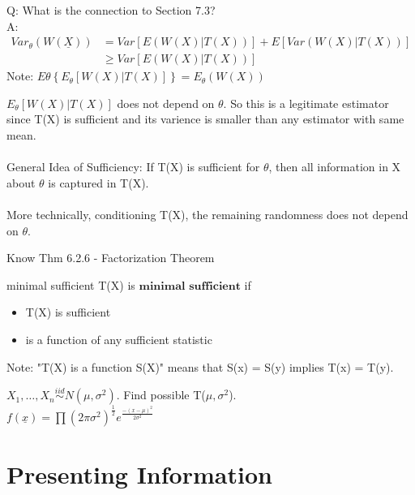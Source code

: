 \documentclass[11pt,fleqn]{book} %
\begin{document}
Q: What is the connection to Section 7.3?\\
A: \begin{align*}
Var_\theta(W(\underline{X})) &= Var\left[E(W(X)|T(X))\right] + E\left[Var(W(X)|T(X)) \right]\\
&\ge Var\left[E(W(X)|T(X))\right]	
\end{align*} 
Note: $E\theta \left\{E_\theta[W(X)|T(X)] \right\} = E_\theta(W(X))$

$E_\theta[W(X)|T(X)]$ does not depend on $\theta$. So this is a legitimate estimator since T(X) is sufficient and its varience is smaller than any estimator with same mean. \\
\\
General Idea of Sufficiency: If T(X) is sufficient for $\theta$, then all information in X about $\theta$ is captured in T(X). \\
\\
More technically, conditioning T(X), the remaining randomness does not depend on $\theta$.

\begin{remark}
	Know Thm 6.2.6 - Factorization Theorem
\end{remark}

\begin{definition}{minimal sufficient}
	 T(X) is $\textbf{minimal sufficient}$ if 
	 \begin{itemize}
	 	\item T(X) is sufficient
	 	\item is a function of any sufficient statistic
	 \end{itemize}
	 Note: "T(X) is a function S(X)" means that S(x) = S(y) implies T(x) = T(y).
\end{definition}

\begin{example}
	 $X_1, \dots, X_n \stackrel{iid}{\sim} N(\mu,\sigma^2)$. Find possible T($\mu,\sigma^2$).\\
	 $f(\underline{x})= \prod (2\pi\sigma^2)^{\frac{1}{2}} e^{\frac{-(x-\mu)^2}{2\sigma^2}}$
\end{example}


\chapter{Presenting Information}
\end{document}
